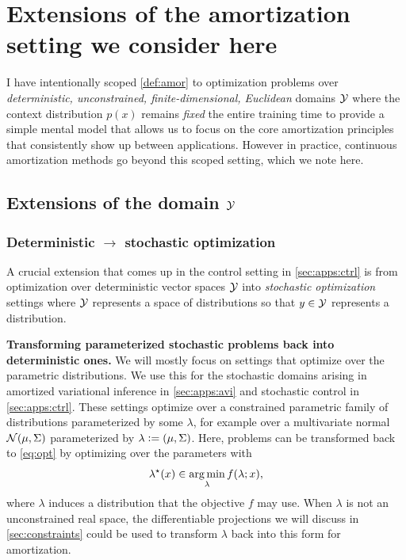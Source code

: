 \documentclass[twoside,11pt]{article}
\begin{document}
\section{Extensions of the amortization setting we consider here}
\label{sec:extensions}

I have intentionally scoped \cref{def:amor} to optimization problems
over \emph{deterministic, unconstrained, finite-dimensional, Euclidean}
domains ${\mathcal{Y}}$ where the context distribution $p(x)$
remains \emph{fixed} the
entire training time to provide a simple mental model that
allows us to focus on the core amortization principles
that consistently show up between applications.
However in practice, continuous amortization methods go
beyond this scoped setting, which we note here.

\subsection{Extensions of the domain ${\mathcal{Y}}$}
\label{sec:extensions:domain}
\subsubsection{Deterministic $\rightarrow$ stochastic optimization}
\label{sec:extensions:sto}
A crucial extension that comes up in the control setting in
\cref{sec:apps:ctrl} is from optimization over deterministic vector
spaces ${\mathcal{Y}}$ into \emph{stochastic optimization} settings
where ${\mathcal{Y}}$ represents a space of distributions
so that $y\in{\mathcal{Y}}$ represents a distribution.

\textbf{Transforming parameterized stochastic problems
  back into deterministic ones.}
We will mostly focus on settings that optimize over
the parametric distributions.
We use this for the stochastic domains arising in amortized
variational inference in \cref{sec:apps:avi} and stochastic
control in \cref{sec:apps:ctrl}.
These settings optimize over a constrained parametric family
of distributions parameterized by some $\lambda$, for example
over a multivariate normal ${\mathcal{N}}(\mu, \Sigma)$ parameterized
by $\lambda\vcentcolon= (\mu, \Sigma)$.
Here, problems can be transformed back to \cref{eq:opt} by
optimizing over the parameters with
\begin{equation}
  \lambda^\star(x) \in \operatorname*{arg\,min}_{\lambda} f(\lambda; x),
  \label{eq:normal-opt}
\end{equation}
where $\lambda$ induces a distribution that the
objective $f$ may use.
When $\lambda$ is not an unconstrained real space, the
differentiable projections we will discuss in \cref{sec:constraints}
could be used to transform $\lambda$ back into this form for amortization.
\end{document}
